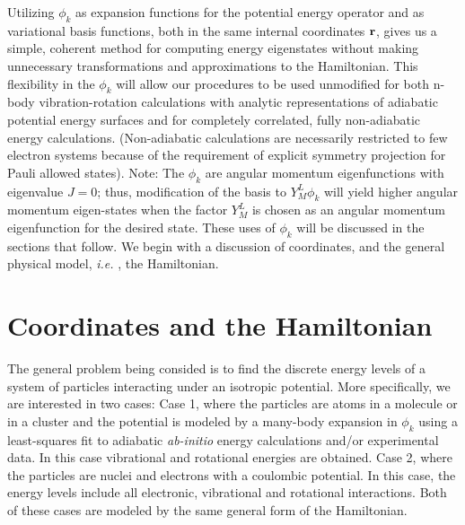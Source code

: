 Utilizing $\phi _k$ as expansion functions for the potential energy operator
and as variational basis functions, both in the same internal coordinates $%
{\bf r}$, gives us a simple, coherent method for computing energy
eigenstates without making unnecessary transformations and approximations to
the Hamiltonian. This flexibility in the $\phi _k$ will allow our procedures
to be used unmodified for both n-body vibration-rotation calculations with
analytic representations of adiabatic potential energy surfaces and for
completely correlated, fully non-adiabatic energy calculations.
(Non-adiabatic calculations are necessarily restricted to few electron
systems because of the requirement of explicit symmetry projection for Pauli
allowed states). Note: The $\phi _k$ are angular momentum eigenfunctions
with eigenvalue $J=0$; thus, modification of the basis to $Y_M^L\phi _k$
will yield higher angular momentum eigen-states when the factor $Y_M^L$ is
chosen as an angular momentum eigenfunction for the desired state. These
uses of $\phi _k$ will be discussed in the sections that follow. We begin
with a discussion of coordinates, and the general physical model, {\it i.e.}%
, the Hamiltonian.

\section{ Coordinates and the Hamiltonian}

The general problem being consided is to find the discrete energy levels of
a system of particles interacting under an isotropic potential. More
specifically, we are interested in two cases: Case 1, where the particles
are atoms in a molecule or in a cluster and the potential is modeled by a
many-body expansion in $\phi _k$ using a least-squares fit to adiabatic {\it %
ab-initio} energy calculations and/or experimental data. In this case
vibrational and rotational energies are obtained. Case 2, where the
particles are nuclei and electrons with a coulombic potential. In this case,
the energy levels include all electronic, vibrational and rotational
interactions. Both of these cases are modeled by the same general form of
the Hamiltonian.

